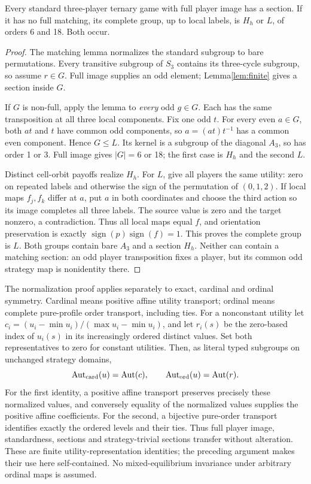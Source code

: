 \begin{theorem}\label{thm:ternary}
Every standard three-player ternary game with full player image has a section.
If it has no full matching, its complete group, up to local labels, is $H_h$
or $L$, of orders 6 and 18. Both occur.
\end{theorem}
\begin{proof}
The matching lemma normalizes the standard subgroup to bare permutations.
Every transitive subgroup of $S_3$ contains its three-cycle subgroup, so assume
$r\in G$. Full image supplies an odd element; Lemma\ref{lem:finite} gives a
section inside $G$.

If $G$ is non-full, apply the lemma to \emph{every} odd $g\in G$. Each has the
same transposition at all three local components. Fix one odd $t$. For every
even $a\in G$, both $at$ and $t$ have common odd components, so $a=(at)t^{-1}$
has a common even component. Hence $G\le L$. Its kernel is a subgroup of the
diagonal $A_3$, so has order 1 or 3. Full image gives $|G|=6$ or 18; the first case
is $H_h$ and the second $L$.

Distinct cell-orbit payoffs realize $H_h$. For $L$, give all players the same
utility: zero on repeated labels and otherwise the sign of the permutation
of $(0,1,2)$. If local maps $f_j,f_k$ differ at $a$, put $a$ in both coordinates
and choose the third action so its image completes all three labels. The
source value is zero and the target nonzero, a contradiction. Thus all local
maps equal $f$, and orientation preservation is exactly
$\operatorname{sign}(p)\operatorname{sign}(f)=1$. This proves the complete
group is $L$. Both groups contain bare $A_3$ and a section $H_h$. Neither can
contain a matching section: an odd player transposition fixes a player, but
its common odd strategy map is nonidentity there.
\end{proof}
The normalization proof applies separately to exact, cardinal and ordinal
symmetry. Cardinal means positive affine utility transport; ordinal means
complete pure-profile order transport, including ties. For a nonconstant utility let
$c_i=(u_i-\min u_i)/(\max u_i-\min u_i)$, and let $r_i(s)$ be the
zero-based index of $u_i(s)$ in its increasingly ordered distinct values.
Set both representatives to zero for constant utilities. Then, as literal
typed subgroups on unchanged strategy domains,
\[
 \operatorname{Aut}_{\rm card}(u)=\operatorname{Aut}(c),\qquad
 \operatorname{Aut}_{\rm ord}(u)=\operatorname{Aut}(r).
\]
For the first identity, a positive affine transport preserves precisely these
normalized values, and conversely equality of the normalized values supplies
the positive affine coefficients. For the second, a bijective pure-order
transport identifies exactly the ordered levels and their ties. Thus full
player image, standardness, sections and strategy-trivial sections transfer
without alteration. These are finite utility-representation identities; the preceding argument
makes their use here self-contained.
No mixed-equilibrium invariance under arbitrary ordinal maps is assumed.
